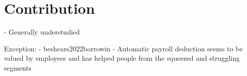 
\section{Contribution}%
\label{sec:contribution}




- Generally understudied

Exception:
- beshears2022borrowin
\citet{philipps2021supporting}
- Automatic payroll deduction seems to be valued by employees and has helped
people from the squeezed and struggling segments 

